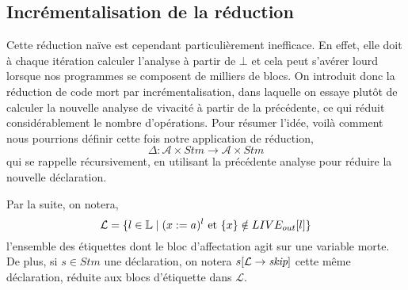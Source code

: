 \documentclass[a4paper, 10pt]{article}
\begin{document}
\subsection{Incrémentalisation de la réduction}
Cette réduction naïve est cependant particulièrement inefficace. En effet, elle doit à chaque itération calculer
l'analyse à partir de $\bot$ et cela peut s'avérer lourd lorsque nos programmes se composent de milliers de blocs.
On introduit donc la réduction de code mort par incrémentalisation, dans laquelle on essaye plutôt de calculer
la nouvelle analyse de vivacité à partir de la précédente, ce qui réduit considérablement le nombre d'opérations.
Pour résumer l'idée, voilà comment nous pourrions définir cette fois notre application de réduction,
\[\Delta : \mathcal{A} \times Stm \longrightarrow \mathcal{A} \times Stm \]
qui se rappelle récursivement, en utilisant la précédente analyse pour réduire la nouvelle déclaration.
\\
\begin{notation}
	Par la suite, on notera,
	\[
		\mathcal{L} = \{l \in \mathbb{L} \mid (x := a)^l \text{ et } \{x\} \notin LIVE_{out}[l]\}	
	\]
	l'ensemble des étiquettes dont le bloc d'affectation agit sur une variable morte.
	De plus, si $s \in Stm$ une déclaration, on notera $s[\mathcal{L} \rightarrow{ \textit{skip} }]$ cette même déclaration, 
	réduite aux blocs d'étiquette dans $\mathcal{L}$.
\end{notation}
\end{document}
